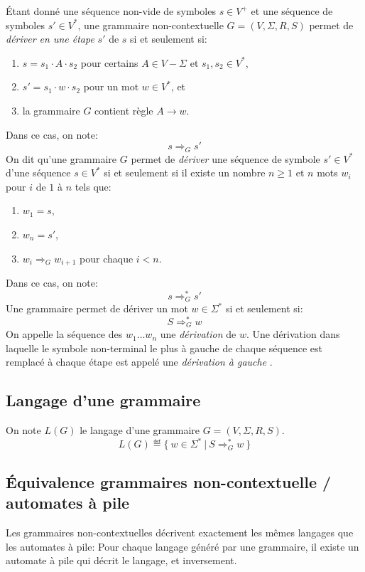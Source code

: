 Étant donné une séquence non-vide de symboles $s \in V^+$ et une séquence de symboles $s' \in V^*$, une grammaire non-contextuelle $G = (V, \Sigma, R, S)$ permet de \og \textit{dériver en une étape} \fg{} $s'$ de $s$ si et seulement si:
\begin{enumerate}
\item $s = s_1 \cdot A \cdot s_2$ pour certains $A \in V - \Sigma$ et $s_1, s_2 \in V^*$,
\item $s' = s_1 \cdot w \cdot s_2$ pour un mot $w \in V^*$, et
\item la grammaire $G$ contient règle $A \to w$.
\end{enumerate}
Dans ce cas, on note:
\[
s \Rightarrow_G s'
\]
On dit qu'une grammaire $G$ permet de \og \textit{dériver} \fg{} une séquence de symbole $s' \in V^*$ d'une séquence $s \in V^*$ si et seulement si il existe un nombre $n \geq 1$ et $n$ mots $w_i$ pour $i$ de $1$ à $n$ tels que:
\begin{enumerate}
\item $w_1 = s$,
\item $w_n = s'$,
\item $w_i \Rightarrow_G w_{i+1}$ pour chaque $i < n$.
\end{enumerate}
Dans ce cas, on note:
\[
s \Rightarrow_G^* s'
\]
Une grammaire permet de dériver un mot $w \in \Sigma^*$ si et seulement si:
\[
S \Rightarrow_G^* w
\]
On appelle la séquence des $w_1 \dots w_n$ une \og \textit{dérivation} \fg{} de $w$.
Une dérivation dans laquelle le symbole non-terminal le plus à gauche de chaque séquence est remplacé à chaque étape est appelé une \og \textit{dérivation à gauche} \fg.

\subsection{Langage d'une grammaire}

On note $L(G)$ le langage d'une grammaire $G = (V, \Sigma, R, S)$.
\[
L(G) \eqdef \{\ w \in \Sigma^*\ |\ S \Rightarrow_G^* w\ \}
\]

\subsection{Équivalence grammaires non-contextuelle / automates à pile}

Les grammaires non-contextuelles décrivent exactement les mêmes langages que les automates à pile:
Pour chaque langage généré par une grammaire, il existe un automate à pile qui décrit le langage, et inversement.

